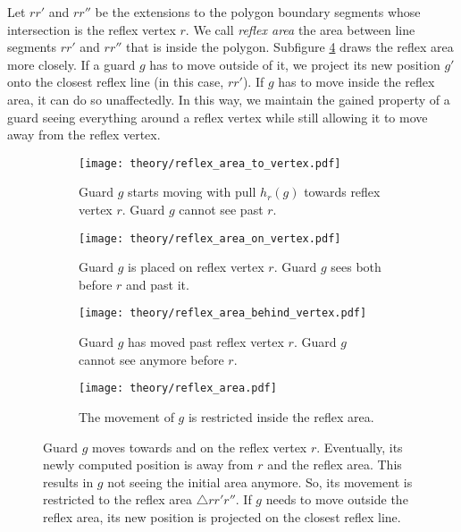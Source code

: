 Let $rr'$ and $rr''$ be the extensions to the polygon boundary segments whose intersection is the reflex vertex $r$. We call \textit{reflex area} the area between line segments $rr'$ and $rr''$ that is inside the polygon. Subfigure \ref{fig:reflex_area} draws the reflex area more closely. If a guard $g$ has to move outside of it, we project its new position $g'$ onto the closest reflex line (in this case, $rr'$). If $g$ has to move inside the reflex area, it can do so unaffectedly. In this way, we maintain the gained property of a guard seeing everything around a reflex vertex while still allowing it to move away from the reflex vertex.

\newpage
\begin{figure}[h!]
    \centering
    \begin{subfigure}{0.45\textwidth}
        \texttt{[image: theory/reflex\_area\_to\_vertex.pdf]}
        \caption{Guard $g$ starts moving with pull $h_r(g)$ towards reflex vertex $r$. Guard $g$ cannot see past $r$.}
        \label{fig:pull_to_on_behind1}
    \end{subfigure}
    \hfill
    \begin{subfigure}{0.45\textwidth}
        \texttt{[image: theory/reflex\_area\_on\_vertex.pdf]}
        \caption{Guard $g$ is placed on reflex vertex $r$. Guard $g$ sees both before $r$ and past it.}
        \label{fig:pull_to_on_behind2}
    \end{subfigure}
    \begin{subfigure}{0.45\textwidth}
        \texttt{[image: theory/reflex\_area\_behind\_vertex.pdf]}
        \caption{Guard $g$ has moved past reflex vertex $r$. Guard $g$ cannot see anymore before $r$.}
        \label{fig:pull_to_on_behind3}
    \end{subfigure}
    \hfill
    \begin{subfigure}{0.45\textwidth}
        \texttt{[image: theory/reflex\_area.pdf]}
        \caption{The movement of $g$ is restricted inside the reflex area.}
        \label{fig:reflex_area}
    \end{subfigure}
    \caption{Guard $g$ moves towards and on the reflex vertex $r$. Eventually, its newly computed position is away from $r$ and the reflex area. This results in $g$ not seeing the initial area anymore. So, its movement is restricted to the reflex area $\triangle rr'r''$. If $g$ needs to move outside the reflex area, its new position is projected on the closest reflex line.}
    \label{fig:pull_to_on_behind}
\end{figure}

